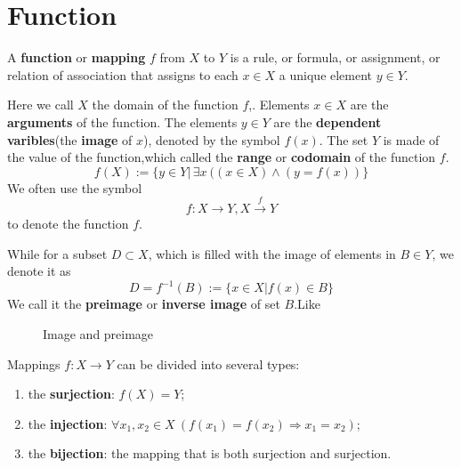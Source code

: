 \section{Function}

A \textbf{function} or \textbf{mapping} $f$ from $X$ to $Y$ is a rule, or formula, or assignment, or relation of association that assigns to each $x\in X$ a unique element $y\in Y$.

Here we call $X$ the domain of the function $f$,. Elements $x\in X$ are the \textbf{arguments}  of the function. The elements $y\in Y$ are the \textbf{dependent varibles}(the \textbf{image} of $x$), denoted by the symbol $f(x)$.
The set $Y$ is made of the value of the function,which called the \textbf{range} or \textbf{codomain} of the function $f$.
\[f(X):=\{y\in Y|\, \exists x\ ((x\in X)\wedge(y=f(x))\}\]
We often use the symbol \[f:X\longrightarrow Y,X\stackrel{f}{\longrightarrow}Y\]to denote the function $f$.


While for a subset $D\subset X$, which is filled with the image of elements in $B\in Y$, we denote it as
\[D=f^{-1}(B):=\{x\in X|f(x)\in B\}\]
We call it the \textbf{preimage} or \textbf{inverse image} of set $B$.Like 

\begin{figure}[ht]
    \centering
    \caption{Image and preimage}
    \label{Image and preimage}
    
\end{figure}
Mappings $f:X\rightarrow Y$ can be divided into several types:
\begin{enumerate}
    \item the \textbf{surjection}: $f(X)=Y$;
    \item the \textbf{injection}: $\forall x_{1},x_{2}\in X\ (f(x_{1})=f(x_{2})\Rightarrow x_{1}=x_{2})$;
    \item the \textbf{bijection}: the mapping that is both surjection and surjection.
\end{enumerate}
